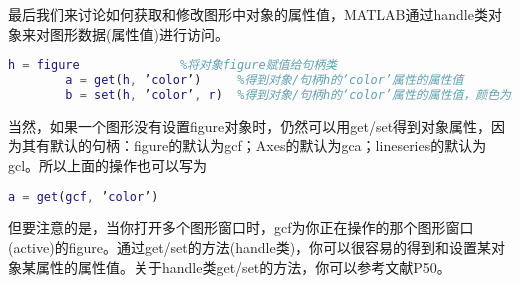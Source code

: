         最后我们来讨论如何获取和修改图形中对象的属性值，MATLAB通过handle类对象来对图形数据(属性值)进行访问\cite{xuxiao.2015}。
        \begin{lstlisting}[language=Matlab]
        h = figure              %将对象figure赋值给句柄类
        a = get(h, ’color’)     %得到对象/句柄h的‘color’属性的属性值
        b = set(h, ’color’, r)  %得到对象/句柄h的‘color’属性的属性值，颜色为红色
        \end{lstlisting}
        \par
        当然，如果一个图形没有设置figure对象时，仍然可以用get/set得到对象属性，因为其有默认的句柄：figure的默认为gcf；Axes的默认为gca；lineseries的默认为gcl。所以上面的操作也可以写为
        \begin{lstlisting}[language = Matlab]
        a = get(gcf, ’color’)
        \end{lstlisting}
        但要注意的是，当你打开多个图形窗口时，gcf为你正在操作的那个图形窗口(active)的figure。通过get/set的方法(handle类)，你可以很容易的得到和设置某对象某属性的属性值。关于handle类get/set的方法，你可以参考文献\cite{xuxiao.2015}P50。
